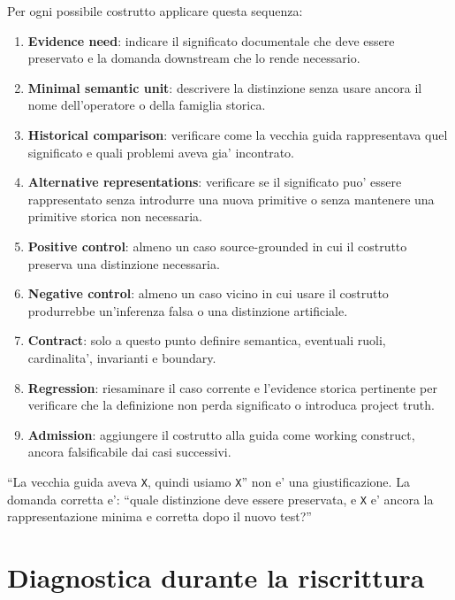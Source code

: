 \documentclass[11pt,a4paper]{article}
\begin{document}
Per ogni possibile costrutto applicare questa sequenza:

\begin{enumerate}
  \item \textbf{Evidence need}: indicare il significato documentale che deve essere preservato e la domanda downstream che lo rende necessario.
  \item \textbf{Minimal semantic unit}: descrivere la distinzione senza usare ancora il nome dell'operatore o della famiglia storica.
  \item \textbf{Historical comparison}: verificare come la vecchia guida rappresentava quel significato e quali problemi aveva gia' incontrato.
  \item \textbf{Alternative representations}: verificare se il significato puo' essere rappresentato senza introdurre una nuova primitive o senza mantenere una primitive storica non necessaria.
  \item \textbf{Positive control}: almeno un caso source-grounded in cui il costrutto preserva una distinzione necessaria.
  \item \textbf{Negative control}: almeno un caso vicino in cui usare il costrutto produrrebbe un'inferenza falsa o una distinzione artificiale.
  \item \textbf{Contract}: solo a questo punto definire semantica, eventuali ruoli, cardinalita', invarianti e boundary.
  \item \textbf{Regression}: riesaminare il caso corrente e l'evidence storica pertinente per verificare che la definizione non perda significato o introduca project truth.
  \item \textbf{Admission}: aggiungere il costrutto alla guida come working construct, ancora falsificabile dai casi successivi.
\end{enumerate}

\begin{ddtaanti}[title={Forbidden shortcut}]
``La vecchia guida aveva \texttt{X}, quindi usiamo \texttt{X}'' non e' una giustificazione. La domanda corretta e': ``quale distinzione deve essere preservata, e \texttt{X} e' ancora la rappresentazione minima e corretta dopo il nuovo test?''
\end{ddtaanti}

\section{Diagnostica durante la riscrittura}
\end{document}
